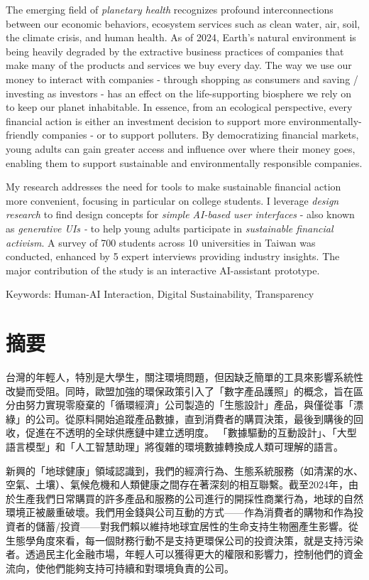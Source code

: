 \documentclass[
  letterpaper,
  DIV=11,
  numbers=noendperiod]{scrartcl}
\begin{document}
The emerging field of \emph{planetary health} recognizes profound
interconnections between our economic behaviors, ecosystem services such
as clean water, air, soil, the climate crisis, and human health. As of
2024, Earth's natural environment is being heavily degraded by the
extractive business practices of companies that make many of the
products and services we buy every day. The way we use our money to
interact with companies - through shopping as consumers and saving /
investing as investors - has an effect on the life-supporting biosphere
we rely on to keep our planet inhabitable. In essence, from an
ecological perspective, every financial action is either an investment
decision to support more environmentally-friendly companies - or to
support polluters. By democratizing financial markets, young adults can
gain greater access and influence over where their money goes, enabling
them to support sustainable and environmentally responsible companies.

My research addresses the need for tools to make sustainable financial
action more convenient, focusing in particular on college students. I
leverage \emph{design research} to find design concepts for \emph{simple
AI-based user interfaces} - also known as \emph{generative UIs -} to
help young adults participate in \emph{sustainable financial activism}.
A survey of 700 students across 10 universities in Taiwan was conducted,
enhanced by 5 expert interviews providing industry insights. The major
contribution of the study is an interactive AI-assistant prototype.

Keywords: Human-AI Interaction, Digital Sustainability, Transparency

\newpage

\section{摘要}\label{ux6458ux8981}

台灣的年輕人，特別是大學生，關注環境問題，但因缺乏簡單的工具來影響系統性改變而受阻。同時，歐盟加強的環保政策引入了「數字產品護照」的概念，旨在區分由努力實現零廢棄的「循環經濟」公司製造的「生態設計」產品，與僅從事「漂綠」的公司。從原料開始追蹤產品數據，直到消費者的購買決策，最後到購後的回收，促進在不透明的全球供應鏈中建立透明度。
「數據驅動的互動設計」、「大型語言模型」和「人工智慧助理」將復雜的環境數據轉換成人類可理解的語言。

新興的「地球健康」領域認識到，我們的經濟行為、生態系統服務（如清潔的水、空氣、土壤）、氣候危機和人類健康之間存在著深刻的相互聯繫。截至2024年，由於生產我們日常購買的許多產品和服務的公司進行的開採性商業行為，地球的自然環境正被嚴重破壞。我們用金錢與公司互動的方式------作為消費者的購物和作為投資者的儲蓄/投資------對我們賴以維持地球宜居性的生命支持生物圈產生影響。從生態學角度來看，每一個財務行動不是支持更環保公司的投資決策，就是支持污染者。透過民主化金融市場，年輕人可以獲得更大的權限和影響力，控制他們的資金流向，使他們能夠支持可持續和對環境負責的公司。
\end{document}

